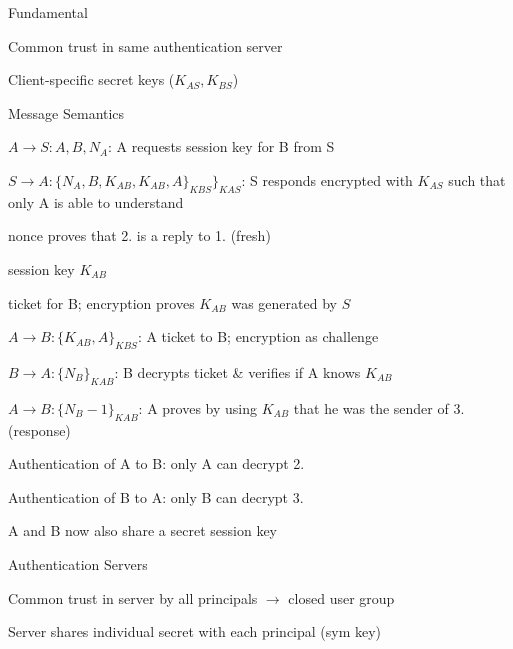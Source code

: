 \documentclass[a4paper]{article}
\begin{document}
\begin{multicols}{3}
    Fundamental
    \begin{itemize*}
        \item Common trust in same authentication server
        \item Client-specific secret keys ($K_{AS}, K_{BS}$)
    \end{itemize*}


    Message Semantics
    \begin{enumerate*}
        \item $A\rightarrow S:A,B,N_A$: A requests session key for B from S
        \item $S\rightarrow A:\{N_A,B,K_{AB},K_{AB},A\}_{KBS}\}_{KAS}$: S responds encrypted with $K_{AS}$ such that only A is able to understand
        \begin{itemize*}
            \item nonce proves that 2. is a reply to 1. (fresh)
            \item session key $K_{AB}$
            \item ticket for B; encryption proves $K_{AB}$ was generated by $S$
        \end{itemize*}
        \item $A\rightarrow B:\{K_{AB},A\}_{KBS}$: A ticket to B; encryption as challenge
        \item $B\rightarrow A:\{N_B\}_{KAB}$: B decrypts ticket \& verifies if A knows $K_{AB}$
        \item $A\rightarrow B:\{N_B-1\}_{KAB}$: A proves by using $K_{AB}$ that he was the sender of 3. (response)
        \begin{itemize*}
            \item Authentication of A to B: only A can decrypt 2.
            \item Authentication of B to A: only B can decrypt 3.
            \item A and B now also share a secret session key
        \end{itemize*}
    \end{enumerate*}

    Authentication Servers
    \begin{itemize*}
        \item Common trust in server by all principals $\rightarrow$ closed user group
        \item Server shares individual secret with each principal (sym key)
    \end{itemize*}


\end{multicols}
\end{document}
